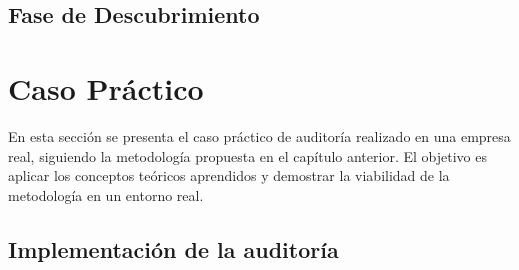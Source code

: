 \documentclass[a4paper, 10pt]{article}
\begin{document}
\subsection{Fase de Descubrimiento}









































































\clearpage




\section{Caso Práctico}

En esta sección se presenta el caso práctico de auditoría realizado en una empresa real, siguiendo la metodología propuesta en el capítulo anterior. El objetivo es aplicar los conceptos teóricos aprendidos y demostrar la viabilidad de la metodología en un entorno real.


\subsection{Implementación de la auditoría}
\end{document}
